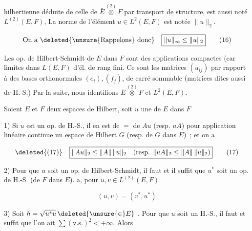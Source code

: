 hilbertienne déduite de celle de $\bar E\overset{(2)}{\otimes}F$ par transport
de structure, est aussi noté $L^{(2)}(E,F)$,  La norme de 
 l'élément $u\in L^2(E,F)$ est notée $\|u\|_2$.

\[
\text{On a }\deleted{\text{\unsure{Rappelons} donc}}\quad\boxed{\|u\|_\infty\leq\|u\|_2} \tag*{(16)}
\]

Les op. de Hilbert-Schmidt de $E$ dans $F$
sont des applications compactes (car limites dans $L(E,F)$ d'él. de rang fini. Ce sont
   les matrices $(u_{ij})$ par rapport à des bases
orthonormales $(e_i),(f_j)$,  de carré sommable
(matrices dites aussi de H.-S.)  Par la suite, nous
identifions $\bar E\overset{(2)}{\otimes} F$ et $L^2(E,F)$.


\uline{} Soient $E$ et $F$ deux espaces de Hilbert,
soit $u$ une   de $E$ dans $F$

1) Si $u$ est un op. de H.-S., il en est de $=$
de $Au$ (resp. $uA$) pour  application linéaire
continue   un espace de Hilbert $G$  (resp. de
$G$ dans $E$) \,; et on a

\[
\deleted{(17)}\quad\boxed{\|Au\|_2\leq\|A\|\,\|u\|_2\quad
\text{(resp. }\|uA\|_2\leq\|A\|\,\|u\|_2\text{)}} \tag*{(17)}
\]

2) Pour que $u$ soit un op. de Hilbert-Schmidt, il
faut et il suffit que $u^*$ soit un op. de
H.-S. (de $F$ dans $E$). 
 a, pour $u,v\in L^{(2)}(E,F)$

\[
\boxed{(u,v)=(v^*,u^*)} \tag*{(18)}
\]


3) Soit $h=\sqrt{u^*u}\,\deleted{\unsure{\in} E}$ . Pour que $u$ soit un
H.-S., il faut et suffit  
 que l'on ait $\sum(\mathrm{v.s.})^2<+\infty$. Alors

